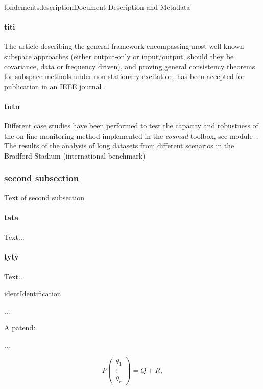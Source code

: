 \documentclass{ra2015}
\begin{document}
\begin{module}{fondements}{description}{Document Description and Metadata}
\paragraph{titi}
The article describing the general framework encompassing 
most well known subspace approaches (either output-only or input/output, 
should they be covariance, data or frequency driven),
and proving general consistency theorems for subspace methods under non stationary excitation,
has been accepted for publication in
an IEEE journal \cite{bretollet}.


\paragraph{tutu}
Different case studies have been performed to test the capacity and robustness 
of the on-line monitoring method implemented in the \emph{cosmad} toolbox, 
see module~\protect{}.
The results of the analysis 
of long datasets from different scenarios in the Bradford Stadium (international benchmark)

\subsubsection{second subsection}
Text of second subsection
\paragraph{tata}
Text...

\paragraph{tyty}
Text...
\end{module}


\begin{module}{}{ident}{Identification}

...

A patend: \cite{Algo09} 

...

\begin{equation}
  P \left(\begin{array} {c}
     \theta_{1} \\ \vdots  \\ \theta_{r} 
\end{array}
  \right) = Q + R, \label{noisident}
\end{equation}

\end{module}
\end{document}
